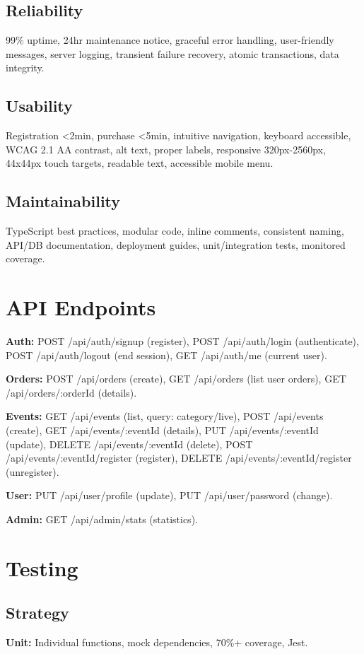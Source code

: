 ﻿\documentclass[11pt]{article}
\begin{document}
\subsection{Reliability}
99\% uptime, 24hr maintenance notice, graceful error handling, user-friendly messages, server logging, transient failure recovery, atomic transactions, data integrity.

\subsection{Usability}
Registration <2min, purchase <5min, intuitive navigation, keyboard accessible, WCAG 2.1 AA contrast, alt text, proper labels, responsive 320px-2560px, 44x44px touch targets, readable text, accessible mobile menu.

\subsection{Maintainability}
TypeScript best practices, modular code, inline comments, consistent naming, API/DB documentation, deployment guides, unit/integration tests, monitored coverage.

\section{API Endpoints}

\textbf{Auth:} POST /api/auth/signup (register), POST /api/auth/login (authenticate), POST /api/auth/logout (end session), GET /api/auth/me (current user).

\textbf{Orders:} POST /api/orders (create), GET /api/orders (list user orders), GET /api/orders/:orderId (details).

\textbf{Events:} GET /api/events (list, query: category/live), POST /api/events (create), GET /api/events/:eventId (details), PUT /api/events/:eventId (update), DELETE /api/events/:eventId (delete), POST /api/events/:eventId/register (register), DELETE /api/events/:eventId/register (unregister).

\textbf{User:} PUT /api/user/profile (update), PUT /api/user/password (change).

\textbf{Admin:} GET /api/admin/stats (statistics).

\section{Testing}

\subsection{Strategy}
\textbf{Unit:} Individual functions, mock dependencies, 70\%+ coverage, Jest.
\end{document}

